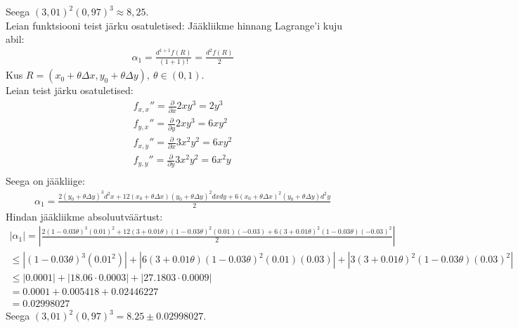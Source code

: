 \documentclass{article}
\newcommand{\p}[1]{\frac{\partial}{\partial #1}}
\begin{document}
Seega $(3,01)^2(0,97)^3\approx 8,25$.\\
Leian funktsiooni teist järku osatuletised:
Jääkliikme hinnang Lagrange'i kuju abil:
\begin{gather*}
\alpha_1=\frac{d^{1+1}f(R)}{(1+1)!}=\frac{d^2f(R)}{2}
\end{gather*}
Kus $R=(x_0+\theta\Delta x, y_0+\theta\Delta y),\ \theta\in(0,1)$.\\
Leian teist järku osatuletised:
\begin{gather*}
f_{x,x}''=\p{x}2xy^3=2y^3\\
f_{y,x}''=\p{y}2xy^3=6xy^2\\
f_{x,y}''=\p{x}3x^2y^2=6xy^2\\
f_{y,y}''=\p{y}3x^2y^2=6x^2y\\
\end{gather*}
Seega on jääkliige:
\begin{gather*}
\alpha_1=\frac{2(y_0+\theta\Delta y)^3d^2x+12(x_0+\theta\Delta x)(y_0+\theta\Delta y)^2dxdy+6(x_0+\theta\Delta x)^2(y_0+\theta\Delta y)d^2y}{2}
\end{gather*}
Hindan jääkliikme absoluutväärtust:
\begin{gather*}
|\alpha_1|=\left|\frac{2(1-0.03\theta)^3(0.01)^2+12(3+0.01\theta)(1-0.03\theta)^2(0.01)(-0.03)+6(3+0.01\theta)^2(1-0.03\theta)(-0.03)^2}{2}\right|\\
\leq\left|(1-0.03\theta)^3(0.01^2)\right|+\left|6(3+0.01\theta)(1-0.03\theta)^2(0.01)(0.03)\right|+\left|3(3+0.01\theta)^2(1-0.03\theta)(0.03)^2\right|\\
\leq\left|0.0001\right|+\left|18.06\cdot0.0003\right|+\left|27.1803\cdot0.0009\right|\\
=0.0001+0.005418+0.02446227\\
=0.02998027
\end{gather*}
Seega $(3,01)^2(0,97)^3=8.25\pm 0.02998027$.
\end{document}
